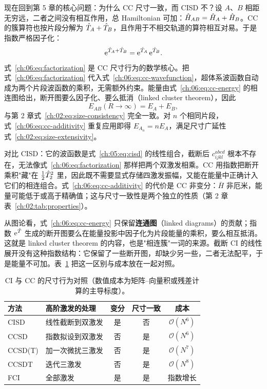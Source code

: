 现在回到第 5 章的核心问题：为什么 CC 尺寸一致，而 CISD 不？设 $A$、$B$ 相距无穷远，二者之间没有相互作用，总 Hamiltonian 可加：$\hat{H}_{AB}=\hat{H}_A+\hat{H}_B$。CC 的簇算符也按片段分解为 $\hat{T}_A+\hat{T}_B$，且作用于不相交轨道的算符相互对易。于是指数严格因子化：
\begin{equation}
\mathrm{e}^{\hat{T}_A+\hat{T}_B}
= \mathrm{e}^{\hat{T}_A}\,\mathrm{e}^{\hat{T}_B}.
\label{ch:06:eq:factorization}
\end{equation}
式~\eqref{ch:06:eq:factorization} 是 CC 尺寸行为的数学核心。把式~\eqref{ch:06:eq:factorization} 代入式~\eqref{ch:06:eq:cc-wavefunction}，超体系波函数自动成为两个片段波函数的乘积，无需额外约束。能量由式~\eqref{ch:06:eq:cc-energy} 的相连图给出，断开图要么因子化、要么抵消（linked cluster theorem），因此
\begin{equation}
E_{AB}(R\to\infty)
= E_A + E_B ,
\label{ch:06:eq:cc-additivity}
\end{equation}
与第 2 章式~\eqref{ch:02:eq:size-consistency} 完全一致。对 $n$ 个相同片段，式~\eqref{ch:06:eq:cc-additivity} 重复应用即得 $E_{A_n}=nE_A$，满足尺寸广延性式~\eqref{ch:02:eq:size-extensivity}。

对比 CISD：它的波函数是式~\eqref{ch:05:eq:cisd} 的线性组合，截断后 $c_{ijkl}^{abcd}$ 根本不存在，无法像式~\eqref{ch:06:eq:factorization} 那样把两个双激发相乘。CC 用指数把断开乘积"藏"在 $\frac12\hat{T}_2^2$ 里，因此既不需要显式存储四激发振幅，又能在能量中正确计入它们的相连组合。式~\eqref{ch:06:eq:cc-additivity} 的代价是 CC 非变分：$\bar{H}$ 非厄米，能量可能低于或高于精确值；这与尺寸一致性是两个独立的性质（第 2 章表~\ref{ch:02:tab:properties}）。

从图论看，式~\eqref{ch:06:eq:cc-energy} 只保留\textbf{连通图}（linked diagrams）的贡献；指数 $\mathrm{e}^{\hat{T}}$ 生成的断开图要么在能量投影中因子化为片段能量的乘积，要么相互抵消。这就是 linked cluster theorem 的内容，也是"相连簇"一词的来源。截断 CI 的线性展开没有这种指数结构：它保留了一些断开图，却缺少另一些，二者无法配平，于是能量不可加。表~\ref{ch:06:tab:compare} 把这一区别与成本放在一起对照。

\begin{table}[t]
\centering
\small
\caption{CI 与 CC 的尺寸行为对照（数值成本为矩阵--向量积或残差计算的主导标度）。}\label{ch:06:tab:compare}
\begin{tabular}{@{}llccc@{}}
\toprule
方法 & 高阶激发的处理 & 变分 & 尺寸一致 & 成本 \\
\midrule
CISD & 线性截断到双激发 & 是 & 否 & $\mathcal{O}(N^6)$ \\
CCSD & 指数拟设到双激发 & 否 & 是 & $\mathcal{O}(N^6)$ \\
CCSD(T) & 加一次微扰三激发 & 否 & 是 & $\mathcal{O}(N^7)$ \\
CCSDT & 迭代三激发 & 否 & 是 & $\mathcal{O}(N^8)$ \\
FCI & 全部激发 & 是 & 是 & 指数增长 \\
\bottomrule
\end{tabular}
\end{table}

